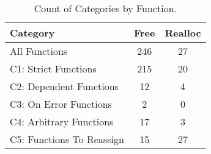 \begin{table}[H]
   \begin{center}
   \begin{tabularx}{0.6\linewidth}{l|c|c}

      Category & Free & Realloc \\
      \hline

      All Functions& 246 & 27 \\

      C1: Strict Functions& 215 & 20 \\

      C2: Dependent Functions& 12 & 4 \\

      C3: On Error Functions& 2 & 0 \\

      C4: Arbitrary Functions& 17 & 3 \\

      C5: Functions To Reassign& 15 & 27 \\

   \end{tabularx}
\end{center}
   \caption{Count of Categories by Function.}
   \label{tab:categories:overview}
\end{table}

